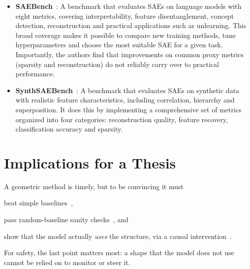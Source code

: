 \documentclass[11pt,a4paper]{article}
\begin{document}
\begin{itemize}
  \item \textbf{SAEBench}~\cite{karvonen2025saebench}: A benchmark that evaluates SAEs on language models with eight metrics, covering interpretability, feature disentanglement, concept detection, reconstruction and practical applications such as unlearning.
  This broad coverage makes it possible to compare new training methods, tune hyperparameters and choose the most suitable SAE for a given task.
  Importantly, the authors find that improvements on common proxy metrics (sparsity and reconstruction) do not reliably carry over to practical performance.

  \item \textbf{SynthSAEBench}~\cite{chanin2026synthsaebench}: A benchmark that evaluates SAEs on synthetic data with realistic feature characteristics, including correlation, hierarchy and superposition. It does this by implementing a comprehensive set of metrics organized into four categories: reconstruction quality, feature recovery, classification accuracy and sparsity.

\end{itemize}

\section{Implications for a Thesis}
A geometric method is timely, but to be convincing it must
\begin{enumerate*}[label=(\alph*)]
  \item beat simple baselines~\cite{wu2025axbench},
  \item pass random-baseline sanity checks~\cite{korznikov2026sanity}, and
  \item show that the model actually \emph{uses} the structure, via a causal
        intervention~\cite{wurgaft2026manifoldsteering}.
\end{enumerate*}
For safety, the last point matters most: a shape that the model does not use cannot be relied on to monitor or steer it.
\end{document}
